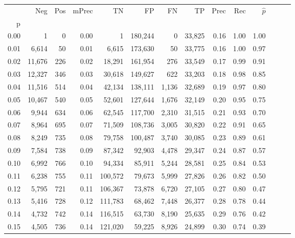 \begin{tabular}{rrrrrrrrrrrrrr}
\toprule
{} &     Neg &  Pos & mPrec &       TN &       FP &      FN &      TP &  Prec &   Rec & $\hat{p}$ \\
p    &         &      &       &          &          &         &         &       &       &           \\
\midrule
0.00 &       1 &    0 &  0.00 &        1 &  180,244 &       0 &  33,825 &  0.16 &  1.00 &      1.00 \\
0.01 &   6,614 &   50 &  0.01 &    6,615 &  173,630 &      50 &  33,775 &  0.16 &  1.00 &      0.97 \\
0.02 &  11,676 &  226 &  0.02 &   18,291 &  161,954 &     276 &  33,549 &  0.17 &  0.99 &      0.91 \\
0.03 &  12,327 &  346 &  0.03 &   30,618 &  149,627 &     622 &  33,203 &  0.18 &  0.98 &      0.85 \\
0.04 &  11,516 &  514 &  0.04 &   42,134 &  138,111 &   1,136 &  32,689 &  0.19 &  0.97 &      0.80 \\
0.05 &  10,467 &  540 &  0.05 &   52,601 &  127,644 &   1,676 &  32,149 &  0.20 &  0.95 &      0.75 \\
0.06 &   9,944 &  634 &  0.06 &   62,545 &  117,700 &   2,310 &  31,515 &  0.21 &  0.93 &      0.70 \\
0.07 &   8,964 &  695 &  0.07 &   71,509 &  108,736 &   3,005 &  30,820 &  0.22 &  0.91 &      0.65 \\
0.08 &   8,249 &  735 &  0.08 &   79,758 &  100,487 &   3,740 &  30,085 &  0.23 &  0.89 &      0.61 \\
0.09 &   7,584 &  738 &  0.09 &   87,342 &   92,903 &   4,478 &  29,347 &  0.24 &  0.87 &      0.57 \\
0.10 &   6,992 &  766 &  0.10 &   94,334 &   85,911 &   5,244 &  28,581 &  0.25 &  0.84 &      0.53 \\
0.11 &   6,238 &  755 &  0.11 &  100,572 &   79,673 &   5,999 &  27,826 &  0.26 &  0.82 &      0.50 \\
0.12 &   5,795 &  721 &  0.11 &  106,367 &   73,878 &   6,720 &  27,105 &  0.27 &  0.80 &      0.47 \\
0.13 &   5,416 &  728 &  0.12 &  111,783 &   68,462 &   7,448 &  26,377 &  0.28 &  0.78 &      0.44 \\
0.14 &   4,732 &  742 &  0.14 &  116,515 &   63,730 &   8,190 &  25,635 &  0.29 &  0.76 &      0.42 \\
0.15 &   4,505 &  736 &  0.14 &  121,020 &   59,225 &   8,926 &  24,899 &  0.30 &  0.74 &      0.39 \\

\end{tabular}
